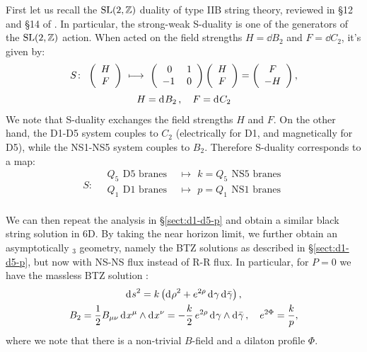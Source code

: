 \documentclass[11pt,a4paper]{article}
\newcommand{\ads}[1]{\text{AdS}\ensuremath{_{#1}}}
\begin{document}
	First let us recall the $\mathrm{SL}(2,\mathbb{Z})$ duality of type IIB string theory, reviewed in \S12 and \S14 of \cite{Polchinski:1998rr}. In particular, the strong-weak S-duality is one of the generators of the $\mathrm{SL}(2,\mathbb{Z})$ action. When acted on the field strengths $H = \dd{B_2}$ and $F = \dd{C_2}$, it's given by:
	\begin{gather}
		S\colon\ %
		\pqty{\begin{array}{c} H \\ F \end{array}}
		\ \longmapsto\ %
		\pqty{\begin{array}{cc}
			0 & 1 \\
			-1\hspace*{.2em} & 0
		\end{array}}
		\pqty{\begin{array}{c} H \\ F \end{array}}
		= \pqty{\begin{array}{c} F \\ -H \end{array}},
	\\[.5ex]
		H = \dd{B_2},\quad F = \dd{C_2} \nonumber
	\end{gather}
	We note that S-duality exchanges the field strengths $H$ and $F$. On the other hand, the D1-D5 system couples to $C_2$ (electrically for D1, and magnetically for D5), while the NS1-NS5 system couples to $B_2$. Therefore S-duality corresponds to a map:
	\begin{equation}
	S\colon\quad
	\begin{aligned}
		Q_5\ \,\text{D5 branes}
		\ \,&\longmapsto\ \,
		k = Q_5\ \,\text{NS5 branes} \\
		Q_1\ \,\text{D1 branes}
		\ \,&\longmapsto\ \,
		p = Q_1\ \,\text{NS1 branes} \\
	\end{aligned}
	\end{equation}
	
	We can then repeat the analysis in \S\ref{sect:d1-d5-p} and obtain a similar black string solution in 6D. By taking the near horizon limit, we further obtain an asymptotically \ads{3} geometry, namely the BTZ solutions as described in \S\ref{sect:d1-d5-p}, but now with NS-NS flux instead of R-R flux. In particular, for $P = 0$ we have the massless BTZ solution \needcites:
	\begin{gather}
		\mathinner{\mathrm{d}^{}s}^2
		= k \left(
			\mathinner{\mathrm{d}^{}\rho}^2
			+ e^{2\rho} \mathinner{\mathrm{d}^{}\gamma} \mathinner{\mathrm{d}^{}\bar{\gamma}}
		\right),
	\label{eq:massless_btz_G}
	\\
		B_2 = \frac{1}{2} B_{\mu\nu}
				\mathinner{\mathrm{d}^{}x^\mu} \wedge \mathinner{\mathrm{d}^{}x^\nu}
		= - \frac{k}{2}\,e^{2\rho}
				\mathinner{\mathrm{d}^{}\gamma} \wedge \mathinner{\mathrm{d}^{}\bar{\gamma}},
	\quad e^{2\Phi} = \frac{k}{p},
	\label{eq:massless_btz_B}
	\end{gather}
	where we note that there is a non-trivial $B$-field and a dilaton profile $\Phi$. 
	
\end{document}
